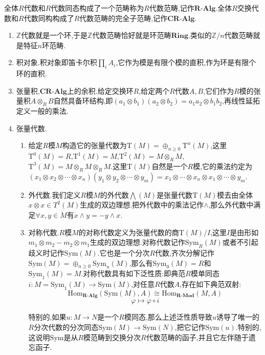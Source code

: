 全体$R$代数和$R$代数同态构成了一个范畴称为$R$代数范畴,记作$\textbf{R-Alg}$.全体$R$交换代数和$R$代数同构构成了$R$代数范畴的完全子范畴,记作$\textbf{CR-Alg}$.
\begin{enumerate}
	\item $\mathbb{Z}$代数就是一个环,于是$\mathbb{Z}$代数范畴恰好就是环范畴$\textbf{Ring}$.类似的$\mathbb{Z}/n$代数范畴就是特征$n$环范畴.
	\item 积对象.积对象即笛卡尔积$\prod_iA_i$,它作为模是有限个模的直积,作为环是有限个环的直积.
	\item 张量积,$\textbf{CR-Alg}$上的余积.给定交换环$R$,给定两个$R$代数$A,B$,它们作为$R$模的张量积$A\otimes_RB$自然具备环结构,即$(a_1\otimes b_1)(a_2\otimes b_2)=a_1a_2\otimes b_1b_2$,再线性延拓定义一般的乘法.
	\item 张量代数.
	\begin{enumerate}
		\item 给定$R$模$M$构造它的张量代数为$\mathrm{T}(M)=\oplus_{n\ge0}\mathrm{T}^n(M)$,这里$\mathrm{T}^0(M)=R$,$\mathrm{T}^1(M)=M$,$\mathrm{T}^2(M)=M\otimes_RM$,$\mathrm{T}^3(M)=M\otimes_RM\otimes_RM$.这里$\mathrm{T}(M)$自然是一个$R$模,它的乘法约定为$(x_1\otimes x_2\otimes\cdots\otimes x_n)(y_1\otimes y_2\otimes\cdots\otimes y_m)=x_1\otimes\cdots\otimes x_n\otimes x_1\otimes\cdots\otimes y_m$.
		\item 外代数.我们定义$R$模$M$的外代数$\bigwedge(M)$是张量代数$\mathrm{T}(M)$模去由全体$x\otimes x\in T^2(M)$生成的双边理想.把外代数中的乘法记作$\wedge$,那么外代数中满足$\forall x,y\in M$有$x\wedge y=-y\wedge x$.
		\item 对称代数.$R$模$M$的对称代数定义为张量代数的商$\mathrm{T}(M)/I$,这里$I$是由形如$m_1\otimes m_2-m_2\otimes m_1$生成的双边理想.对称代数记作$\mathrm{Sym}_R(M)$或者不引起歧义时记作$\mathrm{Sym}(M)$.它也是一个分次$R$代数,齐次分解记作$\mathrm{Sym}(M)=\oplus_{n\ge0}\mathrm{Sym}_n(M)$,那么有$\mathrm{Sym}_0(M)=R$和$\mathrm{Sym}_1(M)=M$.对称代数具有如下泛性质:即典范$R$模单同态$i:M=\mathrm{Sym}_1(M)\to\mathrm{Sym}(M)$,对任意$R$代数$A$,存在如下典范双射:
		$$\mathrm{Hom}_{\textbf{R-Alg}}(\mathrm{Sym}(M),A)\cong\mathrm{Hom}_{\textbf{R-Mod}}(M,A)$$
		$$\varphi\mapsto\varphi\circ i$$
		
		特别的,如果$u:M\to N$是一个$R$模同态,那么上述泛性质导致$u$诱导了唯一的$R$分次代数的分次同态$\mathrm{Sym}(M)\to\mathrm{Sym}(N)$,把它记作$\mathrm{Sym}(u)$.特别的,这说明$\mathrm{Sym}$是从$R$模范畴到交换分次$R$代数范畴的函子,并且它左伴随于遗忘函子.
		
		\qquad
		

\end{enumerate}
\end{enumerate}

